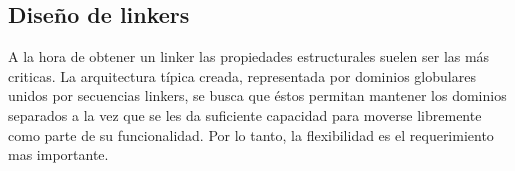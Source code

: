 % 
% 
% 
% 









































  
  
  
  
  
  
  
  
  
  
  
\subsection{Diseño de linkers}
\label{linkerDesign}
A la hora de obtener un linker las propiedades estructurales suelen ser las más criticas.
La arquitectura típica creada, representada por dominios globulares unidos por secuencias linkers, se busca que éstos permitan 
mantener los dominios separados a la vez que se les da suficiente capacidad para moverse libremente como parte de su funcionalidad. 
Por lo tanto, la flexibilidad es el requerimiento mas importante.

